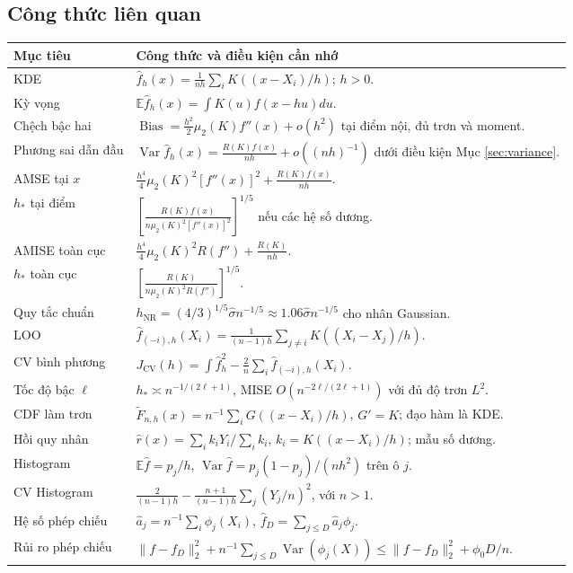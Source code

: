 \documentclass[11pt,a4paper]{article}
\newcommand{\E}{\mathbb E}
\newcommand{\fh}{\widehat f_h}
\DeclareMathOperator{\Var}{Var}
\DeclareMathOperator{\Bias}{Bias}
\begin{document}
\subsection{Công thức liên quan}
\renewcommand{\arraystretch}{1.35}
\begin{longtable}{p{}p{}}
\toprule
Mục tiêu & Công thức và điều kiện cần nhớ\\
\midrule
\endhead
KDE & $\fh(x)=\frac1{nh}\sum_iK((x-X_i)/h)$; $h>0$.\\
Kỳ vọng & $\E\fh(x)=\int K(u)f(x-hu)du$.\\
Chệch bậc hai & $\Bias=\frac{h^2}2\mu_2(K)f''(x)+o(h^2)$ tại điểm nội, đủ trơn và moment.\\
Phương sai dẫn đầu & $\Var\fh(x)=\frac{R(K)f(x)}{nh}+o((nh)^{-1})$ dưới điều kiện Mục \ref{sec:variance}.\\
AMSE tại $x$ & $\frac{h^4}4\mu_2(K)^2[f''(x)]^2+\frac{R(K)f(x)}{nh}$.\\
$h_*$ tại điểm & $\left[\frac{R(K)f(x)}{n\mu_2(K)^2[f''(x)]^2}\right]^{1/5}$ nếu các hệ số dương.\\
AMISE toàn cục & $\frac{h^4}4\mu_2(K)^2R(f'')+\frac{R(K)}{nh}$.\\
$h_*$ toàn cục & $\left[\frac{R(K)}{n\mu_2(K)^2R(f'')}\right]^{1/5}$.\\
Quy tắc chuẩn & $h_{\mathrm{NR}}=(4/3)^{1/5}\widehat\sigma n^{-1/5}\approx1.06\widehat\sigma n^{-1/5}$ cho nhân Gaussian.\\
LOO & $\widehat f_{(-i),h}(X_i)=\frac1{(n-1)h}\sum_{j\ne i}K((X_i-X_j)/h)$.\\
CV bình phương & $J_{\mathrm{CV}}(h)=\int\fh^2-\frac2n\sum_i\widehat f_{(-i),h}(X_i)$.\\
Tốc độ bậc $\ell$ & $h_*\asymp n^{-1/(2\ell+1)}$, MISE $O(n^{-2\ell/(2\ell+1)})$ với đủ độ trơn $L^2$.\\
CDF làm trơn & $\widetilde F_{n,h}(x)=n^{-1}\sum_iG((x-X_i)/h)$, $G'=K$; đạo hàm là KDE.\\
Hồi quy nhân & $\widehat r(x)=\sum_i k_iY_i/\sum_i k_i$, $k_i=K((x-X_i)/h)$; mẫu số dương.\\
Histogram & $\E\widehat f=p_j/h$, $\Var\widehat f=p_j(1-p_j)/(nh^2)$ trên ô $j$.\\
CV Histogram & $\frac2{(n-1)h}-\frac{n+1}{(n-1)h}\sum_j(Y_j/n)^2$, với $n>1$.\\
Hệ số phép chiếu & $\widehat a_j=n^{-1}\sum_i\phi_j(X_i)$, $\widehat f_D=\sum_{j\leq D}\widehat a_j\phi_j$.\\
Rủi ro phép chiếu & $\|f-f_D\|_2^2+n^{-1}\sum_{j\leq D}\Var(\phi_j(X))\leq\|f-f_D\|_2^2+\phi_0D/n$.\\

\end{longtable}
\end{document}
